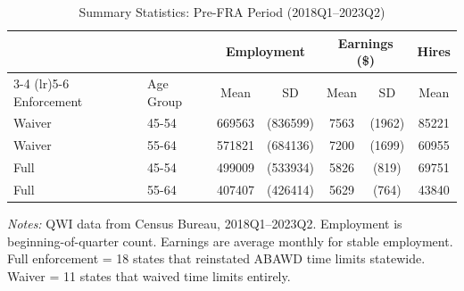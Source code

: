 \begin{table}[htbp]
\begin{threeparttable}
\centering
\caption{Summary Statistics: Pre-FRA Period (2018Q1--2023Q2)}
\label{tab:summary}
\begin{tabular}{llccccc}
\toprule
 & & \multicolumn{2}{c}{Employment} & \multicolumn{2}{c}{Earnings (\$)} & Hires \\
\cmidrule(lr){3-4} \cmidrule(lr){5-6}
Enforcement & Age Group & Mean & SD & Mean & SD & Mean \\
\midrule
Waiver & 45-54 & 669563 & (836599) & 7563 & (1962) & 85221 \\
Waiver & 55-64 & 571821 & (684136) & 7200 & (1699) & 60955 \\
Full & 45-54 & 499009 & (533934) & 5826 & (819) & 69751 \\
Full & 55-64 & 407407 & (426414) & 5629 & (764) & 43840 \\
\bottomrule
\end{tabular}
\begin{tablenotes}[flushleft]
\small
\item \textit{Notes:} QWI data from Census Bureau, 2018Q1--2023Q2. Employment is beginning-of-quarter count. Earnings are average monthly for stable employment. Full enforcement = 18 states that reinstated ABAWD time limits statewide. Waiver = 11 states that waived time limits entirely.
\end{tablenotes}
\end{threeparttable}
\end{table}

